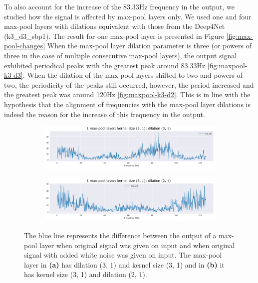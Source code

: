 To also account for the increase of the 83.33Hz frequency in the output, we studied how the signal is affected by max-pool layers only.
We used one and four max-pool layers with dilations equivalent with those from the Deep4Net (k3\_d3\_sbp1).
The result for one max-pool layer is presented in Figure \ref{fig:max-pool-changes}
When the max-pool layer dilation parameter is three (or powers of three in the case of multiple consecutive max-pool layers), the output signal exhibited periodical peaks with the greatest peak around 83.33Hz \ref{fig:maxpool-k3-d3}.
When the dilation of the max-pool layers shifted to two and powers of two, the periodicity of the peaks still occurred, however, the period increased and the greatest peak was around 120Hz \ref{fig:maxpool-k3-d2}.
This is in line with the hypothesis that the alignment of frequencies with the max-pool layer dilations is indeed the reason for the increase of this frequency in the output.


\begin{figure}
\centering
\begin{subfigure}[b]{\textwidth}
   \includegraphics[width=1\linewidth]{img/ch4/absVel-maxpool-k3-d3}
   \caption{}
   \label{fig:Ng1} 
\end{subfigure}

\begin{subfigure}[b]{\textwidth}
   \includegraphics[width=1\linewidth]{img/ch4/absVel-maxpool-k3-d2}
   \caption{}
   \label{fig:Ng2}
\end{subfigure}

\caption[]{The blue line represents the difference between the output of a max-pool layer when original signal was given on input and when original signal with added white noise was given on input. The max-pool layer in \textbf{(a)} has dilation (3, 1) and kernel size (3, 1) and in \textbf{(b)} it has kernel size (3, 1) and dilation (2, 1).} 
\end{figure}\label{fig:max-pool-changes}

